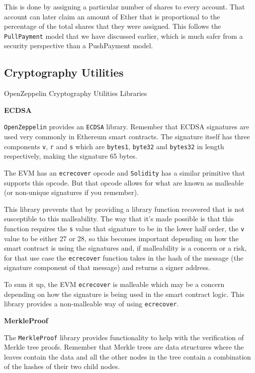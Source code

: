This is done by assigning a particular number of shares to every
account. That account can later claim an amount of Ether that is
proportional to the percentage of the total shares that they were
assigned. This follows the \texttt{PullPayment} model that we have
discussed earlier, which is much safer from a security perspective than
a PushPayment model.

\subsection{Cryptography Utilities}\label{cryptography-utilities}

OpenZeppelin Cryptography Utilities Libraries

\textbf{ECDSA}

\texttt{OpenZeppelin} provides an \texttt{ECDSA} library. Remember that
ECDSA signatures are used very commonly in Ethereum smart contracts. The
signature itself has three components \texttt{v}, \texttt{r} and
\texttt{s} which are \texttt{bytes1}, \texttt{byte32} and
\texttt{bytes32} in length respectively, making the signature 65 bytes.

The EVM has an \texttt{ecrecover} opcode and \texttt{Solidity} has a
similar primitive that supports this opcode. But that opcode allows for
what are known as malleable (or non-unique signatures if you remember).

This library prevents that by providing a library function recovered
that is not susceptible to this malleability. The way that it's made
possible is that this function requires the \texttt{s} value that
signature to be in the lower half order, the \texttt{v} value to be
either 27 or 28, so this becomes important depending on how the smart
contract is using the signatures and, if malleability is a concern or a
risk, for that use case the \texttt{ecrecover} function takes in the
hash of the message (the signature component of that message) and
returns a signer address.

To sum it up, the EVM \texttt{ecrecover} is malleable which may be a
concern depending on how the signature is being used in the smart
contract logic. This library provides a non-malleable way of using
\texttt{ecrecover}.

\textbf{MerkleProof}

The \texttt{MerkleProof} library provides functionality to help with the
verification of Merkle tree proofs. Remember that Merkle trees are data
structures where the leaves contain the data and all the other nodes in
the tree contain a combination of the hashes of their two child nodes.

